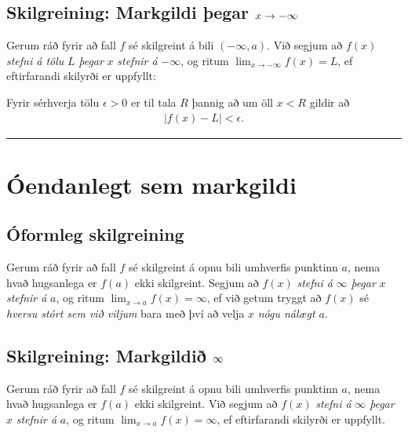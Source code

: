 \documentclass[a4paper,10pt,icelandic]{sphinxmanual}
\begin{document}
\subsection{Skilgreining: Markgildi þegar \protect\(x \to -\infty\protect\)}
\label{kafli02:id6}
Gerum ráð fyrir að fall \(f\) sé skilgreint á bili
\((-\infty,a)\). Við segjum að \(f(x)\) \emph{stefni á tölu}
\(L\) \emph{þegar} \(x\) \emph{stefnir á} \(-\infty\), og ritum
\(\lim_{x\rightarrow -\infty} f(x)=L\), ef eftirfarandi skilyrði er
uppfyllt:

Fyrir sérhverja tölu \(\epsilon>0\) er til tala \(R\)
þannig að um öll \(x<R\) gildir að
\begin{equation*}
\begin{split}|f(x)-L|<\epsilon.\end{split}
\end{equation*}

\bigskip\hrule{}\bigskip



\section{Óendanlegt sem markgildi}
\label{kafli02:oendanlegt-sem-markgildi}

\subsection{Óformleg skilgreining}
\label{kafli02:index-5}\label{kafli02:id7}
Gerum ráð fyrir að fall \(f\) sé skilgreint á opnu bili umhverfis
punktinn \(a\), nema hvað hugsanlega er \(f(a)\) ekki
skilgreint. Segjum að \(f(x)\) \emph{stefni á} \(\infty\) \emph{þegar}
\(x\) \emph{stefnir á} \(a\), og ritum
\(\lim_{x\rightarrow a} f(x)=\infty\), ef við getum tryggt að
\(f(x)\) sé \emph{hversu stórt sem við viljum} bara með því að velja
\(x\) \emph{nógu nálægt} \(a\).


\subsection{Skilgreining: Markgildið \protect\(\infty\protect\)}
\label{kafli02:id8}
Gerum ráð fyrir að fall \(f\) sé skilgreint á opnu bili umhverfis
punktinn \(a\), nema hvað hugsanlega er \(f(a)\) ekki
skilgreint. Við segjum að \(f(x)\) \emph{stefni á} \(\infty\) \emph{þegar}
\(x\) \emph{stefnir á} \(a\), og ritum
\(\lim_{x\rightarrow a} f(x)=\infty\), ef eftirfarandi skilyrði er
uppfyllt.
\end{document}
